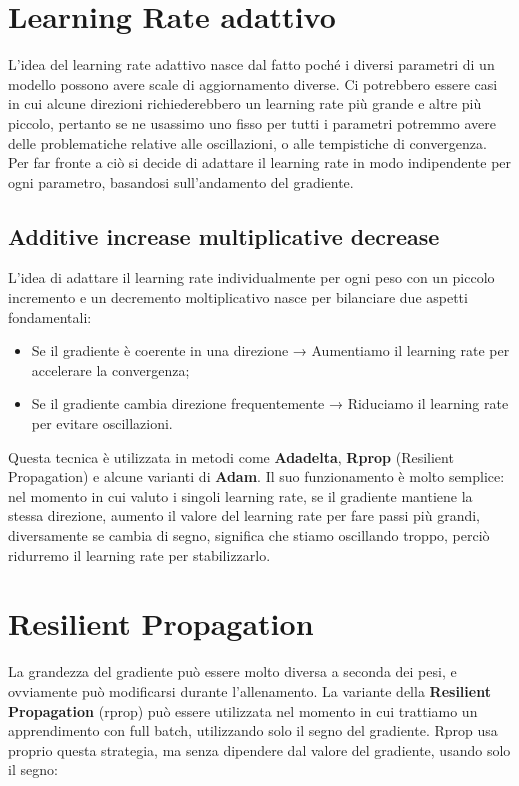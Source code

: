 \section{Learning Rate adattivo}
L'idea del learning rate adattivo nasce dal fatto poché i diversi parametri di un modello possono avere scale di aggiornamento diverse. Ci potrebbero essere casi in cui alcune direzioni richiederebbero un learning rate più grande e altre più piccolo, pertanto se ne usassimo uno fisso per tutti i parametri potremmo avere delle problematiche relative alle oscillazioni, o alle tempistiche di convergenza. Per far fronte a ciò si decide di adattare il learning rate in modo indipendente per ogni parametro, basandosi sull'andamento del gradiente.

\subsection{Additive increase multiplicative decrease}
L'idea di adattare il learning rate individualmente per ogni peso con un piccolo incremento e un decremento moltiplicativo nasce per bilanciare due aspetti fondamentali:
\begin{itemize}
    \item Se il gradiente è coerente in una direzione → Aumentiamo il learning rate per accelerare la convergenza;
    \item Se il gradiente cambia direzione frequentemente → Riduciamo il learning rate per evitare oscillazioni.
\end{itemize}

Questa tecnica è utilizzata in metodi come \textbf{Adadelta}, \textbf{Rprop} (Resilient Propagation) e alcune varianti di \textbf{Adam}. Il suo funzionamento è molto semplice: nel momento in cui valuto i singoli learning rate, se il gradiente mantiene la stessa direzione, aumento il valore del learning rate per fare passi più grandi, diversamente se cambia di segno, significa che stiamo oscillando troppo, perciò ridurremo il learning rate per stabilizzarlo.

\section{Resilient Propagation}
La grandezza del gradiente può essere molto diversa a seconda dei pesi, e ovviamente può modificarsi durante l'allenamento. La variante della \textbf{Resilient Propagation} (rprop) può essere utilizzata nel momento in cui trattiamo un apprendimento con full batch, utilizzando solo il segno del gradiente. Rprop usa proprio questa strategia, ma senza dipendere dal valore del gradiente, usando solo il segno:

